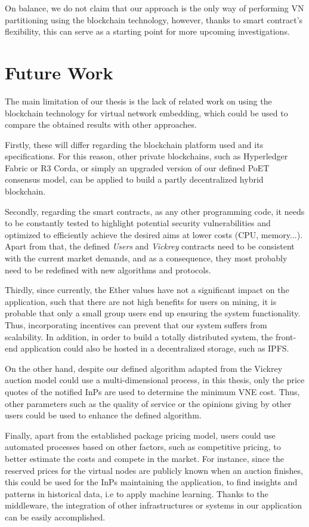 On balance, we do not claim that our approach is the only way of performing VN partitioning using the blockchain technology, however,  thanks to smart contract's flexibility, this can serve as a starting point for more upcoming investigations.

\section{Future Work}

The main limitation of our thesis is the lack of related work on using the blockchain technology for virtual network embedding, which could be used to compare the obtained results with other approaches.

Firstly, these will differ regarding the blockchain platform used and its specifications. For this reason, other private blockchains, such as Hyperledger Fabric or R3 Corda, or simply an upgraded version of our defined PoET consensus model, can be applied to build a partly decentralized hybrid blockchain.

Secondly, regarding the smart contracts, as any other programming code, it needs to be constantly tested to highlight potential security vulnerabilities and optimized to efficiently achieve the desired aims at lower costs (CPU, memory...). Apart from that, the defined \textit{Users} and \textit{Vickrey} contracts need to be consistent with the current market demands, and as a consequence, they most probably need to be redefined with new algorithms and protocols.

Thirdly, since currently, the Ether values have not a significant impact on the application, such that there are not high benefits for users on mining, it is probable that only a small group users end up ensuring the system functionality. Thus, incorporating incentives can prevent that our system suffers from scalability. In addition, in order to build a totally distributed system, the front-end application could also be hosted in a decentralized storage, such as IPFS. 

On the other hand, despite our defined algorithm adapted from the Vickrey auction model could use a multi-dimensional process, in this thesis, only the price quotes of the notified InPs are used to determine the minimum VNE cost. Thus, other parameters such as the quality of service or the opinions giving by other users could be used to enhance the defined algorithm.

Finally, apart from the established package pricing model, users could use automated processes based on other factors, such as competitive pricing, to better estimate the costs and compete in the market. For instance, since the reserved prices for the virtual nodes are publicly known when an auction finishes, this could be used for the InPs maintaining the application, to find insights and patterns in historical data, i.e to apply machine learning. Thanks to the middleware, the integration of other infrastructures or systems in our application can be easily accomplished.
 
